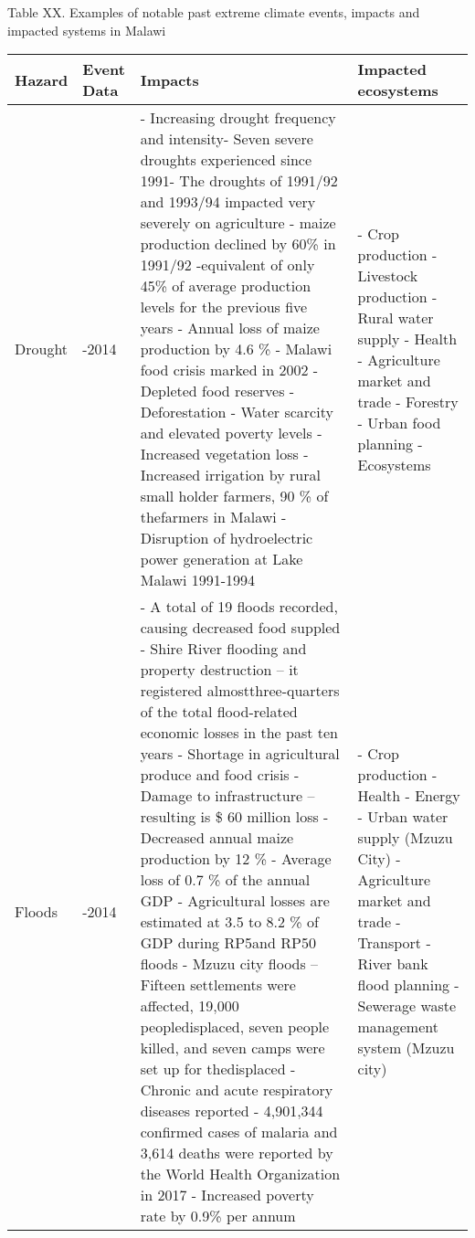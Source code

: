\documentclass[
]{book}
\begin{document}
Table XX. Examples of notable past extreme climate events, impacts and impacted systems in Malawi

\begin{longtable}[]{@{}
  >{\raggedright\arraybackslash}p{}
  >{\raggedright\arraybackslash}p{}
  >{\raggedright\arraybackslash}p{}
  >{\raggedright\arraybackslash}p{}@{}}
\toprule
\textbf{Hazard} & \textbf{Event Data} & \textbf{Impacts} & \textbf{Impacted ecosystems} \\
\midrule
\endhead
Drought & 1960-2014 & - Increasing drought frequency and intensity- Seven severe droughts experienced since 1991- The droughts of 1991/92 and 1993/94 impacted very severely on agriculture - maize production declined by 60\% in 1991/92 -equivalent of only 45\% of average production levels for the previous five years - Annual loss of maize production by 4.6 \% - Malawi food crisis marked in 2002 - Depleted food reserves - Deforestation - Water scarcity and elevated poverty levels - Increased vegetation loss - Increased irrigation by rural small holder farmers, 90 \% of thefarmers in Malawi - Disruption of hydroelectric power generation at Lake Malawi 1991-1994 & - Crop production - Livestock production - Rural water supply - Health - Agriculture market and trade - Forestry - Urban food planning - Ecosystems \\
Floods & 1967-2014 & - A total of 19 floods recorded, causing decreased food suppled - Shire River flooding and property destruction -- it registered almostthree-quarters of the total flood-related economic losses in the past ten years - Shortage in agricultural produce and food crisis - Damage to infrastructure -- resulting is \$ 60 million loss - Decreased annual maize production by 12 \% - Average loss of 0.7 \% of the annual GDP - Agricultural losses are estimated at 3.5 to 8.2 \% of GDP during RP5and RP50 floods - Mzuzu city floods -- Fifteen settlements were affected, 19,000 peopledisplaced, seven people killed, and seven camps were set up for thedisplaced - Chronic and acute respiratory diseases reported - 4,901,344 confirmed cases of malaria and 3,614 deaths were reported by the World Health Organization in 2017 - Increased poverty rate by 0.9\% per annum & - Crop production - Health - Energy - Urban water supply (Mzuzu City) - Agriculture market and trade - Transport - River bank flood planning - Sewerage waste management system (Mzuzu city) \\

\end{longtable}
\end{document}
